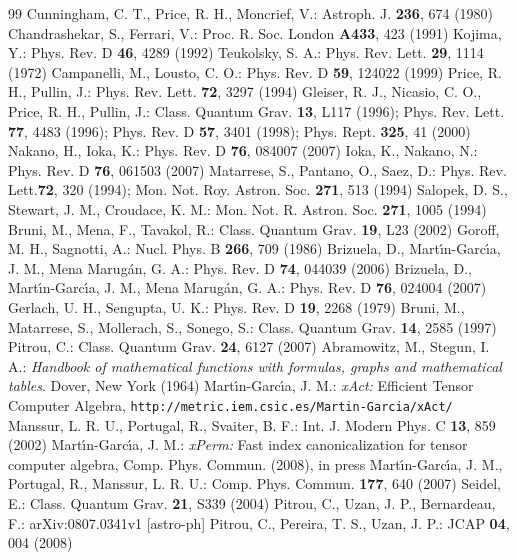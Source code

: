 \documentclass[aps,prd,showpacs]{revtex4}
\begin{document}
\begin{thebibliography}{99}
Cunningham, C. T., Price, R. H., Moncrief, V.: Astroph. J. {\bf 236}, 674 (1980)
Chandrashekar, S., Ferrari, V.: Proc. R. Soc. London {\bf A433}, 423 (1991)
Kojima, Y.: Phys. Rev. D {\bf 46}, 4289 (1992)
Teukolsky, S. A.: Phys. Rev. Lett. {\bf 29}, 1114 (1972)
Campanelli, M., Lousto, C. O.: Phys. Rev. D {\bf 59}, 124022 (1999)
Price, R. H., Pullin, J.: Phys. Rev. Lett. {\bf 72}, 3297 (1994)
Gleiser, R. J., Nicasio, C. O., Price, R. H., Pullin, J.:
Class. Quantum Grav. {\bf 13}, L117 (1996);
Phys. Rev. Lett. {\bf 77}, 4483 (1996);
Phys. Rev. D {\bf 57}, 3401 (1998);
Phys. Rept. {\bf 325}, 41 (2000)
Nakano, H., Ioka, K.: Phys. Rev. D {\bf 76}, 084007 (2007)
Ioka, K., Nakano, N.: Phys. Rev. D {\bf 76}, 061503 (2007)
Matarrese, S., Pantano, O., Saez, D.: Phys. Rev. Lett.{\bf 72}, 320 (1994);
Mon. Not. Roy. Astron. Soc. {\bf 271}, 513 (1994)
Salopek, D. S., Stewart, J. M., Croudace, K. M.: Mon. Not. R. Astron. Soc.
{\bf 271}, 1005 (1994)
Bruni, M., Mena, F., Tavakol, R.: Class. Quantum Grav. {\bf 19}, L23 (2002)
Goroff, M. H., Sagnotti, A.: Nucl. Phys. B {\bf 266}, 709 (1986)
Brizuela, D., Mart\'\i n-Garc\'\i a, J. M., Mena Marug\'an, G. A.:
Phys. Rev. D {\bf 74}, 044039 (2006)
Brizuela, D., Mart\'\i n-Garc\'\i a, J. M., Mena Marug\'an, G. A.:
Phys. Rev. D {\bf 76}, 024004 (2007)
Gerlach, U. H., Sengupta, U. K.: Phys. Rev. D {\bf 19}, 2268 (1979)
Bruni, M., Matarrese, S., Mollerach, S., Sonego, S.:
Class. Quantum Grav. {\bf 14}, 2585 (1997)
Pitrou, C.: Class. Quantum Grav. {\bf 24}, 6127 (2007)
Abramowitz, M., Stegun, I. A.: {\em Handbook of mathematical functions
with formulas, graphs and mathematical tables}. Dover, New York (1964)
Mart\'\i n-Garc\'\i a, J. M.: {\em xAct:} Efficient Tensor Computer Algebra,
{\tt http://metric.iem.csic.es/Martin-Garcia/xAct/}
Manssur, L. R. U., Portugal, R., Svaiter, B. F.:
Int. J. Modern Phys. C {\bf 13}, 859 (2002)
Mart\'\i n-Garc\'\i a, J. M.:
{\em xPerm:} Fast index canonicalization for tensor computer algebra,
Comp. Phys. Commun. (2008), in press
Mart\'\i n-Garc\'\i a, J. M., Portugal, R., Manssur, L. R. U.:
Comp. Phys. Commun. {\bf 177}, 640 (2007)
Seidel, E.: Class. Quantum Grav. {\bf 21}, S339 (2004)
Pitrou, C., Uzan, J. P., Bernardeau, F.: arXiv:0807.0341v1 [astro-ph]
Pitrou, C., Pereira, T. S., Uzan, J. P.: JCAP {\bf 04}, 004 (2008)
\end{thebibliography}
\end{document}
